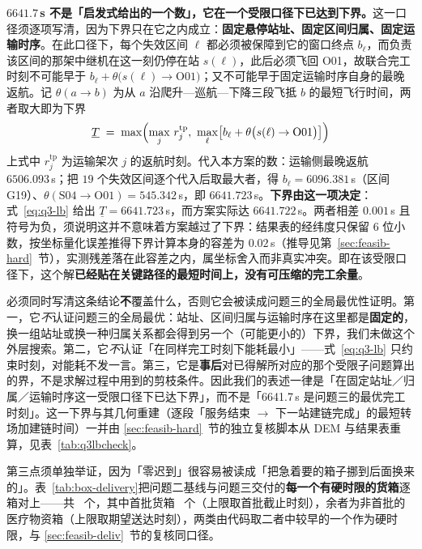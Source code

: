 \textbf{$6641.7$\,s 不是「启发式给出的一个数」，它在一个受限口径下已达到下界。}这一口径须逐项写清，因为下界只在它之内成立：\textbf{固定悬停站址、固定区间归属、固定运输时序}。在此口径下，每个失效区间 $\ell$ 都必须被保障到它的窗口终点 $b_\ell$，而负责该区间的那架中继机在这一刻仍停在站 $s(\ell)$，此后必须飞回 O01，故联合完工时刻不可能早于 $b_\ell+\theta\big(s(\ell)\to\mathrm{O01}\big)$；又不可能早于固定运输时序自身的最晚返航。记 $\theta(a\to b)$ 为从 $a$ 沿爬升—巡航—下降三段飞抵 $b$ 的最短飞行时间，两者取大即为下界
\begin{equation}
\underline{T}\;=\;\max\Bigl(\max_{j}\,r_j^{\mathrm{tp}},\ \max_{\ell}\bigl[b_\ell+\theta\bigl(s(\ell)\to\mathrm{O01}\bigr)\bigr]\Bigr)
\label{eq:q3-lb}
\end{equation}
上式中 $r_j^{\mathrm{tp}}$ 为运输架次 $j$ 的返航时刻。代入本方案的数：运输侧最晚返航 $6506.093$\,s；把 $19$ 个失效区间逐个代入后取最大者，得 $b_\ell=6096.381$\,s（区间 G19）、$\theta(\mathrm{S04}\to\mathrm{O01})=545.342$\,s，即 $6641.723$\,s。\textbf{下界由这一项决定}：式~\eqref{eq:q3-lb} 给出 $\underline{T}=6641.723$\,s，而方案实际达 $6641.722$\,s。两者相差 $0.001$\,s 且符号为负，须说明这并不意味着方案越过了下界：结果表的经纬度只保留 6 位小数，按坐标量化误差推得下界计算本身的容差为 $0.02$\,s（推导见第~\ref{sec:feasib-hard}~节），实测残差落在此容差之内，属坐标舍入而非真实冲突。即在该受限口径下，这个解\textbf{已经贴在关键路径的最短时间上，没有可压缩的完工余量}。

必须同时写清这条结论\textbf{不}覆盖什么，否则它会被读成问题三的全局最优性证明。第一，它\emph{不}认证问题三的全局最优：站址、区间归属与运输时序在这里都是\textbf{固定的}，换一组站址或换一种归属关系都会得到另一个（可能更小的）下界，我们未做这个外层搜索。第二，它\emph{不}认证「在同样完工时刻下能耗最小」——式~\eqref{eq:q3-lb} 只约束时刻，对能耗不发一言。第三，它是\textbf{事后}对已得解所对应的那个受限子问题算出的界，不是求解过程中用到的剪枝条件。因此我们的表述一律是「在固定站址／归属／运输时序这一受限口径下已达下界」，而不是「6641.7\,s 是问题三的最优完工时刻」。这一下界与其几何重建（逐段「服务结束 $\to$ 下一站建链完成」的最短转场加建链时间）一并由 \ref{sec:feasib-hard}~节的独立复核脚本从 DEM 与结果表重算，见表~\ref{tab:q3lbcheck}。

第三点须单独举证，因为「零迟到」很容易被读成「把急着要的箱子挪到后面换来的」。表~\ref{tab:box-delivery}把问题二基线与问题三交付的\textbf{每一个有硬时限的货箱}逐箱对上——共 \mtQthreeHardBoxes\ 个，其中首批货箱 \mtQthreeFirstBoxes\ 个（上限取首批截止时刻），余者为非首批的医疗物资箱（上限取期望送达时刻），两类由代码取二者中较早的一个作为硬时限，与 \ref{sec:feasib-deliv}~节的复核同口径。

